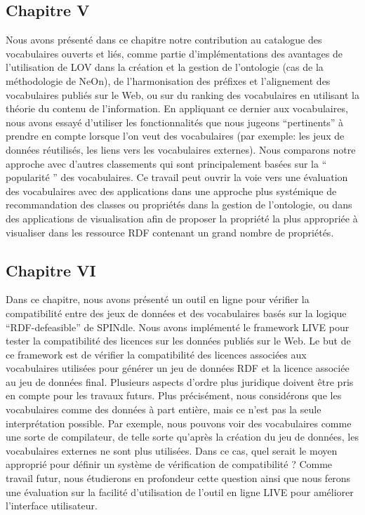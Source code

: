 \subsection*{Chapitre V}
Nous avons pr\'{e}sent\'{e} dans ce chapitre notre contribution au catalogue des vocabulaires ouverts et li\'{e}s, comme partie d'impl\'{e}mentations des avantages de l'utilisation de LOV dans la cr\'{e}ation et la gestion de l'ontologie (cas de la m\'{e}thodologie de NeOn), de l'harmonisation des pr\'{e}fixes et l'alignement des vocabulaires publi\'{e}s sur le Web, ou sur du ranking des vocabulaires en utilisant la th\'{e}orie du contenu de l'information. En appliquant ce dernier aux vocabulaires, nous avons essay\'{e} d'utiliser les fonctionnalit\'{e}s que nous jugeons ``pertinents''  à prendre en compte lorsque l'on veut des vocabulaires (par exemple: les jeux de donn\'{e}es r\'{e}utilis\'{e}s, les liens vers les vocabulaires externes). Nous comparons notre approche avec d'autres classements qui sont principalement bas\'{e}es sur la `` popularit\'{e} '' des vocabulaires. Ce travail peut ouvrir la voie vers une \'{e}valuation des vocabulaires avec des applications dans une approche plus syst\'{e}mique de recommandation des classes ou propri\'{e}t\'{e}s dans la gestion de l'ontologie, ou dans des applications de visualisation afin de proposer la  propri\'{e}t\'{e} la plus appropri\'{e}e à visualiser dans les ressource RDF contenant un grand nombre de propri\'{e}t\'{e}s.

\subsection*{Chapitre VI}
Dans ce chapitre, nous avons pr\'{e}sent\'{e} un outil en ligne pour v\'{e}rifier la compatibilit\'{e} entre des jeux de donn\'{e}es et des vocabulaires bas\'{e}s sur la logique ``RDF-defeasible'' de SPINdle. Nous avons impl\'{e}ment\'{e} le framework LIVE pour tester la compatibilit\'{e} des licences sur les donn\'{e}es publi\'{e}s sur le Web. Le but de ce framework est de v\'{e}rifier la compatibilit\'{e} des licences associ\'{e}es aux vocabulaires utilis\'{e}es pour g\'{e}n\'{e}rer un jeu de donn\'{e}es RDF et la licence associ\'{e}e au jeu de donn\'{e}es final. Plusieurs aspects d'ordre plus juridique doivent \^{e}tre pris en compte pour les travaux futurs. Plus pr\'{e}cis\'{e}ment, nous consid\'{e}rons que les vocabulaires comme des donn\'{e}es à part enti\`{e}re, mais ce n'est pas la seule interpr\'{e}tation possible. Par exemple, nous pouvons voir des vocabulaires comme une sorte de compilateur, de telle sorte qu'apr\`{e}s la cr\'{e}ation du jeu de donn\'{e}es, les vocabulaires externes ne sont plus utilis\'{e}es. Dans ce cas, quel serait le moyen appropri\'{e} pour d\'{e}finir un syst\`{e}me de v\'{e}rification de compatibilit\'{e} ? Comme travail futur, nous \'{e}tudierons en profondeur cette question ainsi que nous ferons une \'{e}valuation sur la facilit\'{e} d'utilisation de l'outil en ligne LIVE pour am\'{e}liorer l'interface utilisateur.

